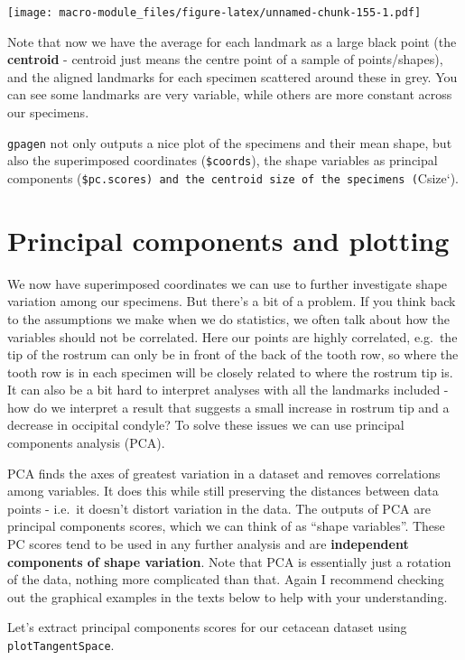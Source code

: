 \documentclass[]{book}
\theoremstyle{definition}
\theoremstyle{definition}
\theoremstyle{definition}
\theoremstyle{remark}
\begin{document}
\texttt{[image: macro-module\_files/figure-latex/unnamed-chunk-155-1.pdf]}

Note that now we have the average for each landmark as a large black
point (the \textbf{centroid} - centroid just means the centre point of a
sample of points/shapes), and the aligned landmarks for each specimen
scattered around these in grey. You can see some landmarks are very
variable, while others are more constant across our specimens.

\texttt{gpagen} not only outputs a nice plot of the specimens and their
mean shape, but also the superimposed coordinates (\texttt{\$coords}),
the shape variables as principal components
(\texttt{\$pc.scores)\ and\ the\ centroid\ size\ of\ the\ specimens\ (}Csize`).

\section{Principal components and
plotting}\label{principal-components-and-plotting}

We now have superimposed coordinates we can use to further investigate
shape variation among our specimens. But there's a bit of a problem. If
you think back to the assumptions we make when we do statistics, we
often talk about how the variables should not be correlated. Here our
points are highly correlated, e.g.~the tip of the rostrum can only be in
front of the back of the tooth row, so where the tooth row is in each
specimen will be closely related to where the rostrum tip is. It can
also be a bit hard to interpret analyses with all the landmarks included
- how do we interpret a result that suggests a small increase in rostrum
tip and a decrease in occipital condyle? To solve these issues we can
use principal components analysis (PCA).

PCA finds the axes of greatest variation in a dataset and removes
correlations among variables. It does this while still preserving the
distances between data points - i.e.~it doesn't distort variation in the
data. The outputs of PCA are principal components scores, which we can
think of as ``shape variables''. These PC scores tend to be used in any
further analysis and are \textbf{independent components of shape
variation}. Note that PCA is essentially just a rotation of the data,
nothing more complicated than that. Again I recommend checking out the
graphical examples in the texts below to help with your understanding.

Let's extract principal components scores for our cetacean dataset using
\texttt{plotTangentSpace}.
\end{document}

